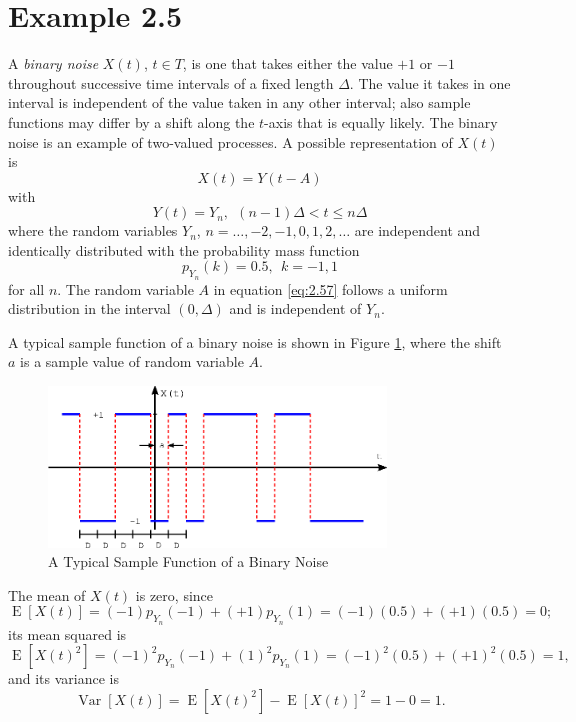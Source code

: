 \documentclass[12pt,letterpaper]{article}
\newcommand{\EE}{\operatorname{E}}
\newcommand{\VV}{\operatorname{Var}}
\begin{document}
\section*{Example 2.5}
A \textsl{binary noise} $X(t)$, $t \in T$, is one that takes either the value $+1$ or $-1$ throughout successive time intervals of a fixed length $\Delta$. The value it takes in one interval is independent of the value taken in any other interval; also sample functions may differ by a shift along the $t$-axis that is equally likely. The binary noise is an example of two-valued processes. A possible representation of $X(t)$ is 
\begin{equation}
X(t) = Y(t-A) \label{eq:2.57}
\end{equation}
with 
\begin{equation}
Y(t) = Y_{n},  \ \ (n-1) \Delta < t \leq n \Delta \label{eq:2.58}
\end{equation}
where the random variables $Y_n$, $n = \ldots, -2, -1, 0, 1, 2, \ldots$ are independent and identically distributed with the probability mass function 
\begin{equation}
p_{Y_n}(k) = 0.5, \ \ k = -1, 1
\end{equation}
for all $n$. The random variable $A$ in equation \eqref{eq:2.57} follows a uniform distribution in the interval $(0,\Delta)$ and is independent of $Y_n$.

A typical sample function of a binary noise is shown in Figure \ref{fig:sample_binary_noise}, where the shift $a$ is a sample value of random variable $A$.
\begin{figure}[!hb]
\centering
{}
\includegraphics[width=0.8\textwidth]{sample_binary_noise.eps}
\caption{A Typical Sample Function of a Binary Noise}
\label{fig:sample_binary_noise}
\end{figure}

The mean of $X(t)$ is zero, since
\begin{equation}
\EE [X(t)] = (-1)p_{Y_n}(-1) + (+1)p_{Y_n}(1) = (-1)(0.5) + (+1)(0.5) = 0;
\end{equation}
its mean squared is
\begin{equation}
\EE[X(t)^2] = (-1)^2 p_{Y_n}(-1) + (1)^2 p_{Y_n}(1) = (-1)^2 (0.5) + (+1)^2(0.5) = 1,
\end{equation}
and its variance is
\begin{equation}
\VV[X(t)] = \EE[X(t)^2] - \EE[X(t)]^2 = 1 - 0 = 1.
\end{equation}
\end{document}
